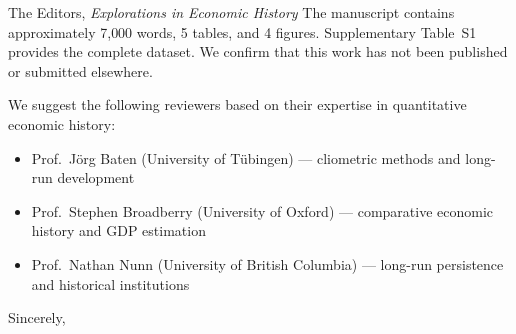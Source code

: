 \documentclass[11pt]{letter}
\begin{document}
\begin{letter}{The Editors, \emph{Explorations in Economic History}}
The manuscript contains approximately 7{,}000 words, 5 tables, and 4 figures. Supplementary Table~S1 provides the complete dataset. We confirm that this work has not been published or submitted elsewhere.

We suggest the following reviewers based on their expertise in quantitative economic history:
\begin{itemize}
\item Prof.\ J\"org Baten (University of T\"ubingen) --- cliometric methods and long-run development
\item Prof.\ Stephen Broadberry (University of Oxford) --- comparative economic history and GDP estimation
\item Prof.\ Nathan Nunn (University of British Columbia) --- long-run persistence and historical institutions
\end{itemize}

\closing{Sincerely,}
\end{letter}
\end{document}
